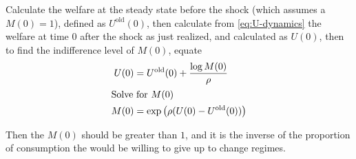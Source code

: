 \documentclass[11pt]{article}
\begin{document}
Calculate the welfare at the steady state before the shock (which assumes a $M(0) = 1$), defined as $U^{\text{old}}(0)$, then calculate from \cref{eq:U-dynamics} the welfare at time $0$ after the shock as just realized, and calculated as $U(0)$, then to find the indifference level of $M(0)$, equate
\begin{align}
	U(0) &= U^{\text{old}}(0)  + \frac{\log M(0)}{\rho}\\
	\intertext{Solve for $M(0)$}
	M(0) &= \exp \left(\rho(U(0) - U^{\text{old}}(0))\right)
\end{align}

Then the $M(0)$ should be greater than $1$, and it is the inverse of the proportion of consumption the would be willing to give up to change regimes.

\newpage

\end{document}

